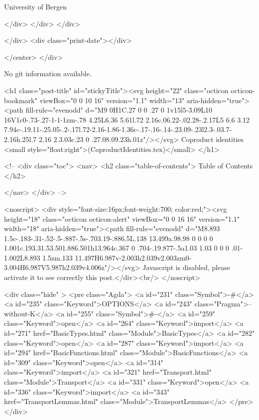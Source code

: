                   University of Bergen
                
                </div>
            </div>
          </div>
          
          
        </div>
        <div class="print-date"></div>
        
        
    </center>
  </div>

  
  No git information available.
  

  <h1 class="post-title" id="stickyTitle"><svg height="22" class="octicon octicon-bookmark" viewBox="0 0 10 16" version="1.1" width="13" aria-hidden="true"><path fill-rule="evenodd" d="M9 0H1C.27 0 0 .27 0 1v15l5-3.09L10 16V1c0-.73-.27-1-1-1zm-.78 4.25L6.36 5.61l.72 2.16c.06.22-.02.28-.2.17L5 6.6 3.12 7.94c-.19.11-.25.05-.2-.17l.72-2.16-1.86-1.36c-.17-.16-.14-.23.09-.23l2.3-.03.7-2.16h.25l.7 2.16 2.3.03c.23 0 .27.08.09.23h.01z"/></svg> Coproduct identities <small style="float:right">(CoproductIdentities.tex)</small>
  </h1>

  <!-- 
  <div class="toc">
    <nav>
    <h2 class="table-of-contents"> Table of Contents </h2>
      

    </nav>
  </div>
   -->

  <noscript>
  <div style="font-size:16px;font-weight:700; color:red;"><svg height="18" class="octicon octicon-alert" viewBox="0 0 16 16" version="1.1" width="18" aria-hidden="true"><path fill-rule="evenodd" d="M8.893 1.5c-.183-.31-.52-.5-.887-.5s-.703.19-.886.5L.138 13.499a.98.98 0 0 0 0 1.001c.193.31.53.501.886.501h13.964c.367 0 .704-.19.877-.5a1.03 1.03 0 0 0 .01-1.002L8.893 1.5zm.133 11.497H6.987v-2.003h2.039v2.003zm0-3.004H6.987V5.987h2.039v4.006z"/></svg> Javascript is disabled, please activate it to see correctly this post.</div><br/>
  </noscript>

  <div class="hide" >
<pre class="Agda">
<a id="231" class="Symbol">{-#</a> <a id="235" class="Keyword">OPTIONS</a> <a id="243" class="Pragma">--without-K</a> <a id="255" class="Symbol">#-}</a>
<a id="259" class="Keyword">open</a> <a id="264" class="Keyword">import</a> <a id="271" href="BasicTypes.html" class="Module">BasicTypes</a>
<a id="282" class="Keyword">open</a> <a id="287" class="Keyword">import</a> <a id="294" href="BasicFunctions.html" class="Module">BasicFunctions</a>
<a id="309" class="Keyword">open</a> <a id="314" class="Keyword">import</a> <a id="321" href="Transport.html" class="Module">Transport</a>
<a id="331" class="Keyword">open</a> <a id="336" class="Keyword">import</a> <a id="343" href="TransportLemmas.html" class="Module">TransportLemmas</a>
</pre>
</div>

